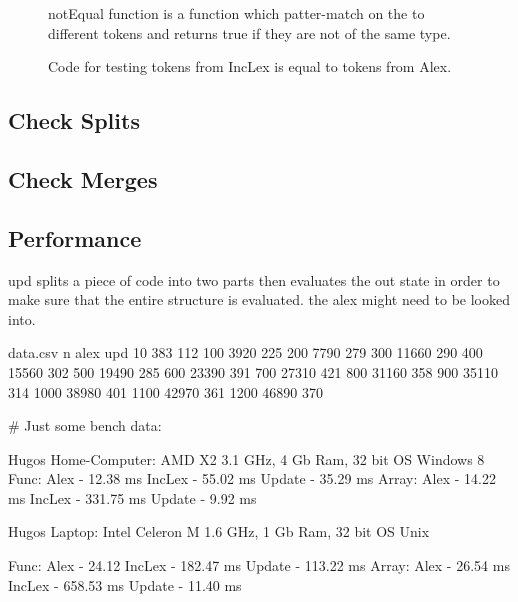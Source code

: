 \begin{figure}[h!]
  \centering
  
  notEqual function is a function which patter-match on the to different tokens and returns true if they are not of the same type.
  \caption{Code for testing tokens from IncLex is equal to tokens from Alex. 
  \label{fig:CheckEquility}}
\end{figure} 

\subsection{Check Splits}

\subsection{Check Merges} 

\subsection{Performance}
upd splits a piece of code into two parts then evaluates the out state in order to make sure that the entire structure is evaluated. the alex might need to be looked into.

\begin{filecontents*}{data.csv}
n     alex   upd
10    383    112
100   3920   225
200   7790   279
300   11660  290
400   15560  302
500   19490  285
600   23390  391
700   27310  421
800   31160  358
900   35110  314
1000  38980  401
1100  42970  361
1200  46890  370
\end{filecontents*}

\# Just some bench data:

Hugos Home-Computer: AMD X2 3.1 GHz, 4 Gb Ram, 32 bit OS Windows 8
Func:
  Alex - 12.38 ms
  IncLex - 55.02 ms
  Update - 35.29 ms
Array:
  Alex - 14.22 ms
  IncLex - 331.75 ms
  Update - 9.92 ms

Hugos Laptop: Intel Celeron M 1.6 GHz, 1 Gb Ram, 32 bit OS Unix

Func:
  Alex - 24.12
  IncLex - 182.47 ms
  Update - 113.22 ms
Array:
  Alex - 26.54 ms
  IncLex - 658.53 ms
  Update - 11.40 ms

